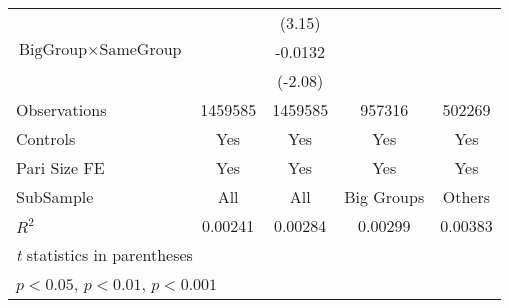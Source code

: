 {\begin{tabular}{l*{4}{c}}
                &                  &   (3.15)         &                  &                  \\
[1em]
$ {\text{BigGroup} } \times {\text{SameGroup} }  $ &                  &  -0.0132\sym{*}  &                  &                  \\
                &                  &  (-2.08)         &                  &                  \\
\hline
Observations    &  1459585         &  1459585         &   957316         &   502269         \\
Controls        &      Yes         &      Yes         &      Yes         &      Yes         \\
Pari Size FE    &      Yes         &      Yes         &      Yes         &      Yes         \\
SubSample       &      All         &      All         &Big Groups         &   Others         \\
$ R^2$          &  0.00241         &  0.00284         &  0.00299         &  0.00383         \\
\hline\hline
\multicolumn{5}{l}{\footnotesize \textit{t} statistics in parentheses}\\
\multicolumn{5}{l}{\footnotesize \sym{*} \(p<0.05\), \sym{**} \(p<0.01\), \sym{***} \(p<0.001\)}\\
\end{tabular}
}
